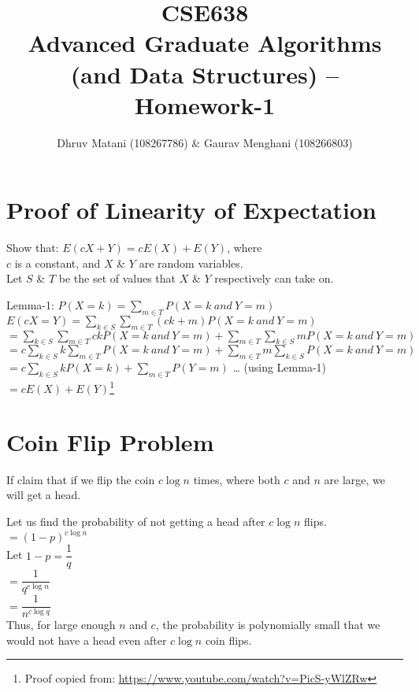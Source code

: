 \documentclass{article}
\title{CSE638 \\ Advanced Graduate Algorithms (and Data Structures) -- Homework-1}
\author{Dhruv Matani (108267786) \& Gaurav Menghani (108266803)}
\begin{document}
\maketitle

\clearpage

\tableofcontents

\clearpage

\section{Proof of Linearity of Expectation}

Show that: $E(cX + Y) = cE(X) + E(Y)$, where\\
$c$ is a constant, and $X$ \& $Y$ are random variables.\\
Let $S$ \& $T$ be the set of values that $X$ \& $Y$ respectively can take on.

Lemma-1: $P(X=k) = \displaystyle\sum\limits_{m \in T} P(X=k\ and\ Y=m)$\\
$E(cX = Y) = \displaystyle\sum\limits_{k \in S} \displaystyle\sum\limits_{m \in T} (ck + m) P(X=k\ and\ Y=m)$\\
$= \displaystyle\sum\limits_{k \in S} \displaystyle\sum\limits_{m \in T} ck P(X=k\ and\ Y=m) + \displaystyle\sum\limits_{m \in T} \displaystyle\sum\limits_{k \in S} m P(X=k\ and\ Y=m)$\\
$= c\displaystyle\sum\limits_{k \in S} k \displaystyle\sum\limits_{m \in T} P(X=k\ and\ Y=m) + \displaystyle\sum\limits_{m \in T} m \displaystyle\sum\limits_{k \in S} P(X=k\ and\ Y=m)$\\
$= c\displaystyle\sum\limits_{k \in S} k P(X=k) + \displaystyle\sum\limits_{m \in T} P(Y=m)$ \ldots{} (using Lemma-1)\\
$= cE(X) + E(Y)$\footnote{Proof copied from: \url{https://www.youtube.com/watch?v=PicS-yWlZRw}}\\

\clearpage

\section{Coin Flip Problem}
If claim that if we flip the coin $c \log{n}$ times, where both $c$ and
$n$ are large, we will get a head.

Let us find the probability of not getting a head after $c \log{n}$ flips.\\
${= (1-p)^{c\log{n}}}$ \\
Let $1-p = \dfrac{1}{q}$ \\
$= \dfrac{1}{q^{c\log{n}}}$ \\
$= \dfrac{1}{n^{c\log{q}}} $\\
Thus, for large enough $n$ and $c$, the probability is polynomially small
that we would not have a head even after $c \log{n}$ coin flips.
\clearpage
\end{document}
